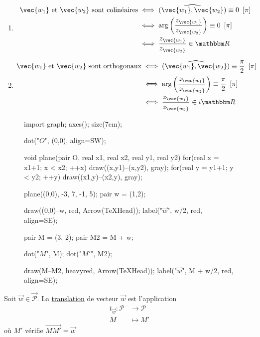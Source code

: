 \begin{prv}
	\begin{enumerate}
		\item
			\begin{align*}
				\vec{w_1} \text{ et } \vec{w_2} \text{ sont colinéaires}
				&\iff \widehat{\left( \vec{w_1}, \vec{w_2} \right)} \equiv 0\mod\pi\\
				&\iff \arg\left( \frac{z_{\vec{w_1}}}{z_{\vec{w_2}}} \right) \equiv 0 \mod \pi\\
				&\iff \frac{z_{\vec{w_1}}}{z_{\vec{w_2}}} \in \R
			\end{align*}
		\item
			\begin{align*}
				\vec{w_1} \text{ et } \vec{w_2} \text{ sont orthogonaux}
				&\iff \widehat{\left( \vec{w_1}, \vec{w_2} \right)} \equiv \frac{\pi}{2}\mod\pi\\
				&\iff \arg\left( \frac{z_{\vec{w_1}}}{z_{\vec{w_2}}} \right) \equiv \frac{\pi}{2} \mod \pi\\
				&\iff \frac{z_{\vec{w_1}}}{z_{\vec{w_2}}} \in i\R
			\end{align*}
	\end{enumerate}
\end{prv}

\begin{defn}
	\begin{wrapfigure}
		{r}{0.5\textwidth}
		\centering
		\begin{asy}
			import graph;
			axes(); size(7cm);

			dot("$O$", (0,0), align=SW);

			void plane(pair O, real x1, real x2, real y1, real y2) {
				for(real x = x1+1; x < x2; ++x) draw((x,y1)--(x,y2), gray);
				for(real y = y1+1; y < y2; ++y) draw((x1,y)--(x2,y), gray);
			}

			plane((0,0), -3, 7, -1, 5);
			pair w = (1,2);

			draw((0,0)--w, red, Arrow(TeXHead));
			label("$\vec{w}$", w/2, red, align=SE);

			pair M = (3, 2);
			pair M2 = M + w;

			dot("$M$", M);
			dot("$M'$", M2);

			draw(M--M2, heavyred, Arrow(TeXHead));
			label("$\vec{w}$", M + w/2, red, align=SE);
		\end{asy}
	\end{wrapfigure}
	Soit $\vec{w} \in \vec{\mathcal{P}}$. La \underline{translation} de vecteur $\vec{w}$ est l'application
	\begin{align*}
		t_{\vec{w}}: \mathcal{P} &\longrightarrow \mathcal{P} \\
		M &\longmapsto M'
	\end{align*} où $M'$ vérifie $\vec{MM'} = \vec{w}$
\end{defn}

